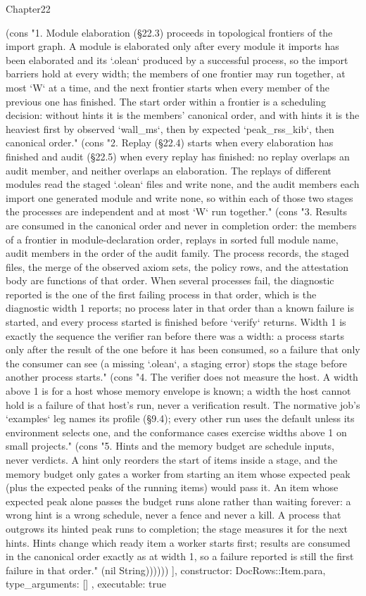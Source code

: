 \begin{lexlean}{Chapter22}
\begin{semanticmodule}
{{      (cons "1. Module elaboration (§22.3) proceeds in topological frontiers of the import graph. A module is elaborated only after every module it imports has been elaborated and its `.olean` produced by a successful process, so the import barriers hold at every width; the members of one frontier may run together, at most `W` at a time, and the next frontier starts when every member of the previous one has finished. The start order within a frontier is a scheduling decision: without hints it is the members' canonical order, and with hints it is the heaviest first by observed `wall_ms`, then by expected `peak_rss_kib`, then canonical order." (cons "2. Replay (§22.4) starts when every elaboration has finished and audit (§22.5) when every replay has finished: no replay overlaps an audit member, and neither overlaps an elaboration. The replays of different modules read the staged `.olean` files and write none, and the audit members each import one generated module and write none, so within each of those two stages the processes are independent and at most `W` run together." (cons "3. Results are consumed in the canonical order and never in completion order: the members of a frontier in module-declaration order, replays in sorted full module name, audit members in the order of the audit family. The process records, the staged files, the merge of the observed axiom sets, the policy rows, and the attestation body are functions of that order. When several processes fail, the diagnostic reported is the one of the first failing process in that order, which is the diagnostic width 1 reports; no process later in that order than a known failure is started, and every process started is finished before `verify` returns. Width 1 is exactly the sequence the verifier ran before there was a width: a process starts only after the result of the one before it has been consumed, so a failure that only the consumer can see (a missing `.olean`, a staging error) stops the stage before another process starts." (cons "4. The verifier does not measure the host. A width above 1 is for a host whose memory envelope is known; a width the host cannot hold is a failure of that host's run, never a verification result. The normative job's `examples` leg names its profile (§9.4); every other run uses the default unless its environment selects one, and the conformance cases exercise widths above 1 on small projects." (cons "5. Hints and the memory budget are schedule inputs, never verdicts. A hint only reorders the start of items inside a stage, and the memory budget only gates a worker from starting an item whose expected peak (plus the expected peaks of the running items) would pass it. An item whose expected peak alone passes the budget runs alone rather than waiting forever: a wrong hint is a wrong schedule, never a fence and never a kill. A process that outgrows its hinted peak runs to completion; the stage measures it for the next hints. Hints change which ready item a worker starts first; results are consumed in the canonical order exactly as at width 1, so a failure reported is still the first failure in that order." (nil String))))))
    ],
    constructor: DocRows::Item.para,
    type_arguments: []
  },
  executable: true
}


\end{semanticmodule}
\end{lexlean}
